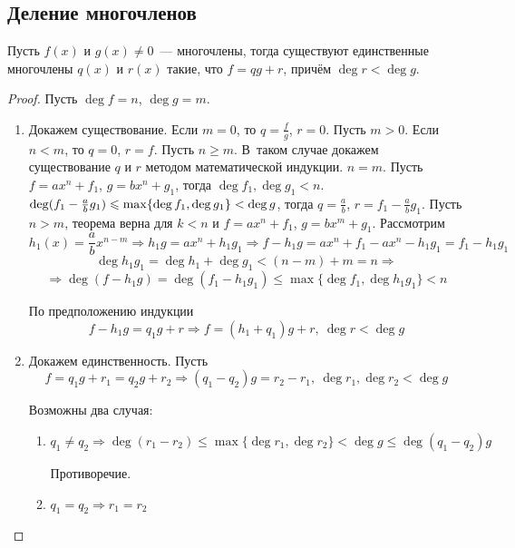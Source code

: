 \subsection{Деление многочленов}
\begin{theorem}
Пусть $f(x)$ и $g(x) \neq 0$~--- многочлены, тогда существуют единственные многочлены $q(x)$ и $r(x)$ такие, что $f = qg + r$, причём $\deg r < \deg g$.
\end{theorem}
\begin{proof}
Пусть $\deg f = n$, $\deg g = m$.
\begin{enumerate}
	\item Докажем существование.
	Если $m = 0$, то $q = \frac{f}g$, $r = 0$.
	Пусть $m > 0$.
	Если $n < m$, то $q = 0$, $r = f$.
	Пусть $n \geqslant m$.
	В~таком случае докажем существование $q$ и $r$ методом математической индукции.
		\indbase $n = m$.
		Пусть $f = a x^n + f_1$, $g = b x^n + g_1$, тогда $\deg f_1, \deg g_1 < n$.
		$\deg (f_1 - \frac{a}b g_1) \opbr\leqslant \max \{ \deg f_1, \deg g_1 \} \opbr< \deg g$, тогда $q = \frac{a}b$, $r = f_1 - \frac{a}b g_1$.
		\indstep Пусть $n > m$, теорема верна для $k < n$ и $f = a x^n + f_1$, $g = b x^m + g_1$.
		Рассмотрим
		\begin{equation*}
		h_1(x) = \frac{a}b x^{n-m} \Rightarrow
		h_1 g = a x^n + h_1 g_1 \Rightarrow
		f - h_1 g = a x^n + f_1 - a x^n - h_1 g_1 = f_1 - h_1 g_1
		\end{equation*}
		\begin{equation*}
		\deg h_1 g_1 = \deg h_1 + \deg g_1 < (n - m) + m = n \Rightarrow
		\end{equation*}
		\begin{equation*}
		\Rightarrow \deg (f - h_1 g) = \deg (f_1 - h_1 g_1) \leqslant \max \{ \deg f_1, \deg h_1 g_1 \} < n
		\end{equation*}
		
		По предположению индукции
		\begin{equation*}
		f - h_1 g = q_1 g + r \Rightarrow
		f = (h_1 + q_1)g + r, \ \deg r < \deg g
		\end{equation*}
		\indend
		
	\item Докажем единственность.
	Пусть
	\begin{equation*}
	f = q_1 g + r_1 = q_2 g + r_2 \Rightarrow
	(q_1 - q_2)g = r_2 - r_1, \ \deg r_1, \deg r_2 < \deg g
	\end{equation*}
	
	Возможны два случая:
	\begin{enumerate}
		\item $q_1 \neq q_2 \Rightarrow
		\deg (r_1 - r_2) \leqslant \max \{ \deg r_1, \deg r_2 \} < \deg g \leqslant \deg (q_1 - q_2)g$
		
		Противоречие.
		
		\item $q_1 = q_2 \Rightarrow r_1 = r_2$
	\end{enumerate}
\end{enumerate}
\end{proof}

